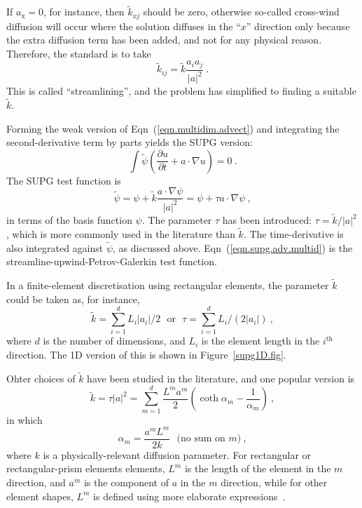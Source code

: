 \documentclass[]{scrreprt}
\begin{document}
If $a_{\mathrm{x}} = 0$, for instance, then $\tilde{k}_{xj}$ should be
zero, otherwise so-called cross-wind diffusion will occur where the
solution diffuses in the ``$x$'' direction only because the extra
diffusion term has been added, and not for any physical reason.
Therefore, the standard is to take
\begin{equation}
\tilde{k}_{ij} = \tilde{k} \frac{a_{i}a_{j}}{|a|^{2}} \ .
\end{equation}
This is called ``streamlining'', and the problem has simplified to
finding a suitable $\tilde{k}$.

Forming the weak version of Eqn~(\ref{eqn.multidim.advect}) and
integrating the second-derivative term by parts yields the SUPG
version:
\begin{equation}
\int \tilde{\psi} \left( \frac{\partial u}{\partial t} + a\cdot\nabla
u \right) = 0 \ .
\end{equation}
The SUPG test function is
\begin{equation}
\tilde{\psi} = \psi + \tilde{k} \frac{a\cdot \nabla\psi}{|a|^{2}}  =
\psi + \tau a\cdot\nabla\psi\ ,
\label{eqn.supg.adv.multid}
\end{equation}
in terms of the basis function $\psi$.  The parameter $\tau$ has been
introduced: $\tau = \tilde{k}/|a|^{2}$, which is more commonly used in
the literature than $\tilde{k}$.  The time-derivative is also
integrated against $\tilde{\psi}$, as discussed above.
Eqn~(\ref{eqn.supg.adv.multid}) is the
streamline-upwind-Petrov-Galerkin test function.

In a finite-element discretisation using rectangular elements, the
parameter $\tilde{k}$ could be taken as, for instance,
\begin{equation}
\tilde{k} = \sum_{i=1}^{d} L_{i} |a_{i}|/2 \ \ \ \mbox{or}\ \ \
\tau = \sum_{i=1}^{d}L_{i}/(2|a_{i}|) \ ,
\label{eqn.simple.ktilde}
\end{equation}
where $d$ is the number of dimensions, and $L_{i}$ is the element
length in the $i^{\mathrm{th}}$ direction.  The 1D version of this is
shown in Figure~\ref{supg1D.fig}.

Ohter choices of $\tilde{k}$
have been studied in the literature, and one popular version is
\begin{equation}
\tilde{k} = \tau |a|^{2} = \sum_{m=1}^{d} \frac{L^{m}a^{m}}{2} \left(
\coth\alpha_{m} - \frac{1}{\alpha_{m}} \right)\ ,
\label{complicated.ktilde.eqn}
\end{equation}
in which
\begin{equation}
\alpha_{m} = \frac{a^{m}L^{m}}{2k} \ \ \ \mbox{(no sum on $m$)} \ ,
\end{equation}
where $k$ is a physically-relevant
diffusion parameter.  For rectangular or rectangular-prism elements
elements, $L^{m}$ is the length of the element in the $m$ direction,
and $a^{m}$ is the component of $a$ in the $m$ direction, while for
other element shapes, $L^{m}$ is defined using more elaborate expressions~\cite{brooks1982}.
\end{document}
